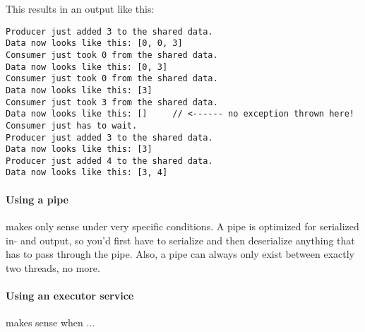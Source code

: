 This results in an output like this: 
\begin{lstlisting}
Producer just added 3 to the shared data.
Data now looks like this: [0, 0, 3]
Consumer just took 0 from the shared data.
Data now looks like this: [0, 3]
Consumer just took 0 from the shared data.
Data now looks like this: [3]
Consumer just took 3 from the shared data.
Data now looks like this: []     // <------ no exception thrown here! Consumer just has to wait. 
Producer just added 3 to the shared data.
Data now looks like this: [3]
Producer just added 4 to the shared data.
Data now looks like this: [3, 4]
\end{lstlisting}


\paragraph{Using a pipe} makes only sense under very specific conditions. A pipe is optimized for serialized in- and output, so you'd first have to serialize and then deserialize anything that has to pass through the pipe. Also, a pipe can always only exist between exactly two threads, no more. 

\paragraph{Using an executor service} makes sense when ...

